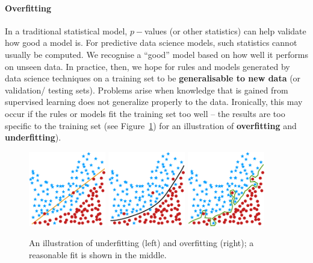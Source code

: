 \paragraph{Overfitting}
In a traditional statistical model, $p-$values (or other statistics) can help validate how good a model is. For predictive data science models, such statistics cannot usually be computed. We recognise a ``good'' model based on how well it performs on unseen data. In practice, then, we hope for rules and models generated by data science techniques on a training set to be \textbf{generalisable to new data} (or validation/ testing sets). \newl Problems arise when knowledge that is gained from supervised learning does not generalize properly to the data. Ironically, this may occur if the rules or models fit the training set too well -- the results are too specific to the training set (see Figure~\ref{fig:uoj}) for an illustration of \textbf{overfitting} and \textbf{underfitting}).
\begin{figure}[!t]
\centering
\includegraphics[width=0.3\textwidth]{images/DSML/underfit.png} \quad \includegraphics[width=0.3\textwidth]{images/DSML/justright.png} \quad \includegraphics[width=0.3\textwidth]{images/DSML/overfit.png}
 \caption[\small An illustration of underfitting and overfitting]{\small An illustration of underfitting (left) and overfitting (right); a reasonable fit is shown in the middle.}\label{fig:uoj}
\end{figure}
